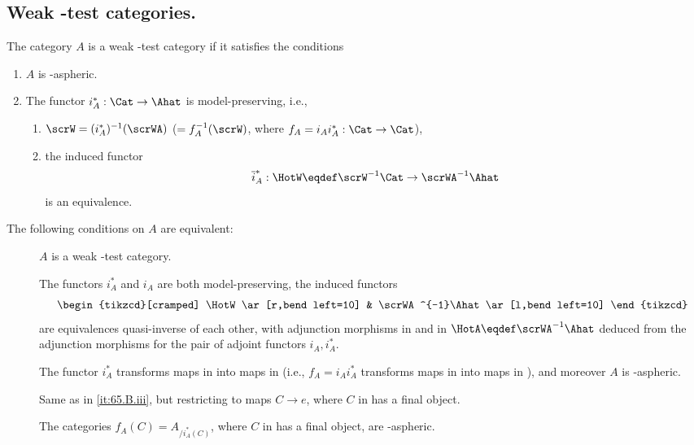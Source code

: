 \subsection{Weak \texorpdfstring{\scrW}{W}-test categories.}
\label{subsec:65.B}

\begin{definitionnum}\label{def:65.2}
  The category $A$ is a weak \scrW-test category if it
  satisfies the conditions
  \begin{enumerate}[label=\alph*)]
  \item\label{it:65.B.a}
    $A$ is \scrW-aspheric.
  \item\label{it:65.B.b}
    The functor $i_A^*:\Cat\to\Ahat$ is model-preserving, i.e.,
    \begin{enumerate}[label=b\textsubscript{\arabic*})]
    \item\label{it:65.B.b1}
      $\scrW=(i_A^*)^{-1}(\scrWA)$ ($=f_A^{-1}(\scrW)$, where
      $f_A=i_Ai_A^*:\Cat\to\Cat$),
    \item\label{it:65.B.b2}
      the induced functor
      \[ \overline i_A^* : \HotW \eqdef \scrW^{-1}\Cat\to
      \scrWA^{-1}\Ahat\]
      is an equivalence.
    \end{enumerate}
  \end{enumerate}
\end{definitionnum}
\begin{propositionnum}\label{prop:65.2}
  The following conditions on $A$ are equivalent:
  \begin{description}
  \item[]
    $A$ is a weak \scrW-test category.
  \item[]
    The functors $i_A^*$ and $i_A$ are both model-preserving, the
    induced functors
    \[\begin{tikzcd}[cramped]
      \HotW\ar[r,bend left=10] & \scrWA^{-1}\Ahat \ar[l,bend left=10]
    \end{tikzcd}\]
    are equivalences quasi-inverse of each other, with adjunction
    morphisms in \HotW{} and in $\HotA\eqdef\scrWA^{-1}\Ahat$ deduced
    from the adjunction morphisms for the pair of adjoint functors $i_A,i_A^*$.
  \item[]
    The functor $i_A^*$ transforms maps in \scrW{} into maps in \scrWA
    \textup(i.e., $f_A=i_Ai_A^*$ transforms maps in \scrW{} into maps
    in \scrW\textup), and moreover $A$ is \scrW-aspheric.
  \item[]
    Same as in \textup{\ref{it:65.B.iii}}, but restricting to maps
    $C\to e$, where $C$ in \Cat{} has a final object.
  \item[]
    The categories $f_A(C)=A_{/i_A^*(C)}$, where $C$ in \Cat{} has a
    final object, are \scrW-aspheric.
  \end{description}
\end{propositionnum}

